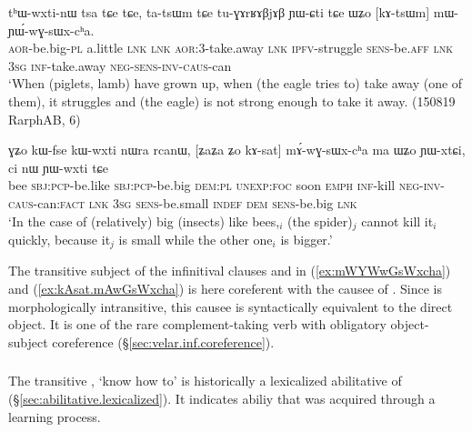 \begin{exe}
\ex \label{ex:mWYWwGsWxcha}
\gll tʰɯ-wxti-nɯ tsa tɕe tɕe, ta-tsɯm tɕe tu-ɣɤrʁɤβjɤβ ɲɯ-ɕti tɕe ɯʑo [kɤ-tsɯm] mɯ-ɲɯ́-wɣ-sɯx-cʰa. \\
\textsc{aor}-be.big-\textsc{pl} a.little \textsc{lnk}  \textsc{lnk} \textsc{aor}:3\flobv{}-take.away \textsc{lnk} \textsc{ipfv}-struggle \textsc{sens}-be.\textsc{aff}   \textsc{lnk} \textsc{3sg} \textsc{inf}-take.away \textsc{neg}-\textsc{sens}-\textsc{inv}-\textsc{caus}-can \\
\glt `When (piglets, lamb) have grown up, when (the eagle tries to) take away (one of them), it struggles and (the eagle) is not strong enough to take it away. (150819 RarphAB, 6)
\end{exe}	

\begin{exe}
\ex \label{ex:kAsat.mAwGsWxcha}
\gll  ɣʑo kɯ-fse kɯ-wxti nɯra rcanɯ, [ʑaʑa ʑo kɤ-sat] mɤ́-wɣ-sɯx-cʰa ma ɯʑo ɲɯ-xtɕi, ci nɯ ɲɯ-wxti tɕe \\
bee \textsc{sbj}:\textsc{pcp}-be.like \textsc{sbj}:\textsc{pcp}-be.big \textsc{dem}:\textsc{pl} \textsc{unexp}:\textsc{foc} soon \textsc{emph} \textsc{inf}-kill \textsc{neg}-\textsc{inv}-\textsc{caus}-can:\textsc{fact} \textsc{lnk} \textsc{3sg} \textsc{sens}-be.small \textsc{indef} \textsc{dem} \textsc{sens}-be.big \textsc{lnk} \\
\glt `In the case of (relatively) big (insects) like bees,$_i$ (the spider)$_j$ cannot kill it$_i$ quickly, because it$_j$ is small while the other one$_i$ is bigger.' 
\end{exe}	

The transitive subject of the infinitival clauses  and  in (\ref{ex:mWYWwGsWxcha}) and (\ref{ex:kAsat.mAwGsWxcha}) is here coreferent with the causee of . Since  is morphologically intransitive, this causee is syntactically equivalent to the direct object. It is one of the rare complement-taking verb with obligatory object-subject coreference (§\ref{sec:velar.inf.coreference}).

 \subsubsection{}  \label{sec:spa.verb}
The transitive , `know how to' is historically a lexicalized abilitative of  (§\ref{sec:abilitative.lexicalized}). It indicates abiliy that was acquired through a learning process.

